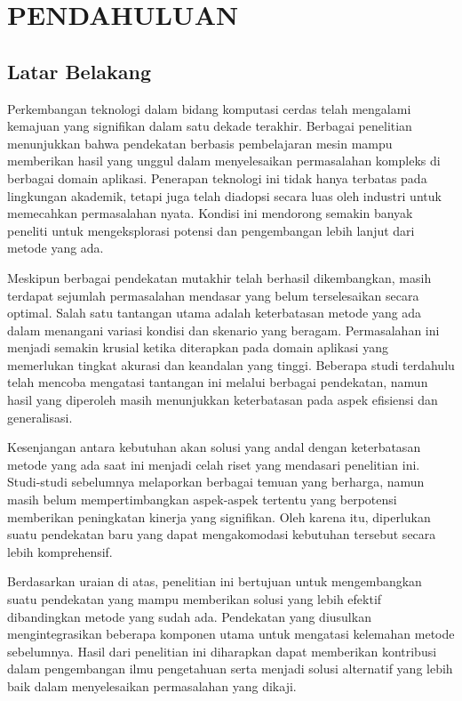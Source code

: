 \chapter{PENDAHULUAN}

\section{Latar Belakang}

Perkembangan teknologi dalam bidang komputasi cerdas telah mengalami kemajuan yang signifikan dalam satu dekade terakhir. Berbagai penelitian menunjukkan bahwa pendekatan berbasis pembelajaran mesin mampu memberikan hasil yang unggul dalam menyelesaikan permasalahan kompleks di berbagai domain aplikasi. Penerapan teknologi ini tidak hanya terbatas pada lingkungan akademik, tetapi juga telah diadopsi secara luas oleh industri untuk memecahkan permasalahan nyata. Kondisi ini mendorong semakin banyak peneliti untuk mengeksplorasi potensi dan pengembangan lebih lanjut dari metode yang ada.

Meskipun berbagai pendekatan mutakhir telah berhasil dikembangkan, masih terdapat sejumlah permasalahan mendasar yang belum terselesaikan secara optimal. Salah satu tantangan utama adalah keterbatasan metode yang ada dalam menangani variasi kondisi dan skenario yang beragam. Permasalahan ini menjadi semakin krusial ketika diterapkan pada domain aplikasi yang memerlukan tingkat akurasi dan keandalan yang tinggi. Beberapa studi terdahulu telah mencoba mengatasi tantangan ini melalui berbagai pendekatan, namun hasil yang diperoleh masih menunjukkan keterbatasan pada aspek efisiensi dan generalisasi.

Kesenjangan antara kebutuhan akan solusi yang andal dengan keterbatasan metode yang ada saat ini menjadi celah riset yang mendasari penelitian ini. Studi-studi sebelumnya melaporkan berbagai temuan yang berharga, namun masih belum mempertimbangkan aspek-aspek tertentu yang berpotensi memberikan peningkatan kinerja yang signifikan. Oleh karena itu, diperlukan suatu pendekatan baru yang dapat mengakomodasi kebutuhan tersebut secara lebih komprehensif.

Berdasarkan uraian di atas, penelitian ini bertujuan untuk mengembangkan suatu pendekatan yang mampu memberikan solusi yang lebih efektif dibandingkan metode yang sudah ada. Pendekatan yang diusulkan mengintegrasikan beberapa komponen utama untuk mengatasi kelemahan metode sebelumnya. Hasil dari penelitian ini diharapkan dapat memberikan kontribusi dalam pengembangan ilmu pengetahuan serta menjadi solusi alternatif yang lebih baik dalam menyelesaikan permasalahan yang dikaji.

